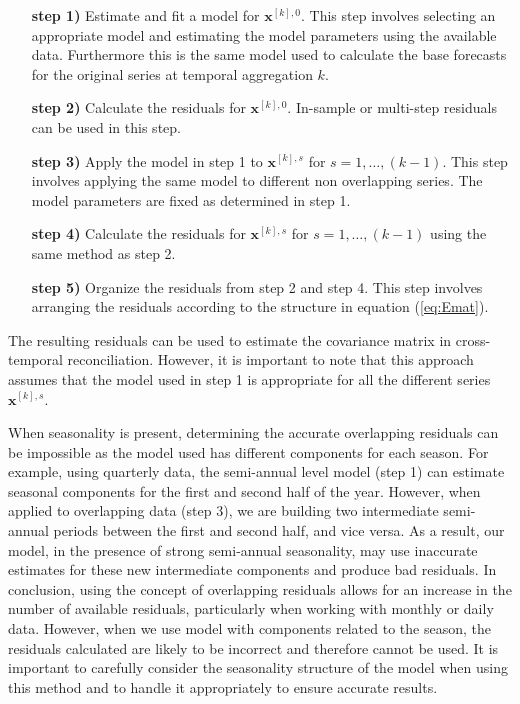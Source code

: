 \documentclass[a4paper,11pt]{article}
\newcommand{\xvet}{\bm{x}}
\theoremstyle{definition}
\begin{document}
\begin{itemize}[leftmargin = 2.5cm, nosep]
	\item[\textbf{step 1)}] Estimate and fit a model for $\xvet^{[k], 0}$. This step involves selecting an appropriate model and estimating the model parameters using the available data. Furthermore this is the same model used to calculate the base forecasts for the original series at temporal aggregation $k$.
    \item[\textbf{step 2)}] Calculate the residuals for $\xvet^{[k], 0}$. In-sample or multi-step residuals can be used in this step.
    \item[\textbf{step 3)}] Apply the model in step 1 to $\xvet^{[k], s}$ for $s = 1, \dots, (k-1)$. This step involves applying the same model to different non overlapping series. The model parameters are fixed as determined in step 1.
    \item[\textbf{step 4)}] Calculate the residuals for $\xvet^{[k], s}$ for $s = 1, \dots, (k-1)$ using the same method as step 2.
    \item[\textbf{step 5)}] Organize the residuals from step 2 and step 4. This step involves arranging the residuals according to the structure in equation (\ref{eq:Emat}).
\end{itemize}
The resulting residuals can be used to estimate the covariance matrix in cross-temporal reconciliation. However, it is important to note that this approach assumes that the model used in step 1 is appropriate for all the different series $\xvet^{[k], s}$.

When seasonality is present, determining the accurate overlapping residuals can be impossible as the model used has different components for each season. For example, using quarterly data, the semi-annual level model (step 1) can estimate seasonal components for the first and second half of the year. However, when applied to overlapping data (step 3), we are building two intermediate semi-annual periods between the first and second half, and vice versa. As a result, our model, in the presence of strong semi-annual seasonality, may use inaccurate estimates for these new intermediate components and produce bad residuals. In conclusion, using the concept of overlapping residuals allows for an increase in the number of available residuals, particularly when working with monthly or daily data. However, when we use model with components related to the season, the residuals calculated are likely to be incorrect and therefore cannot be used. It is important to carefully consider the seasonality structure of the model when using this method and to handle it appropriately to ensure accurate results.
\end{document}
